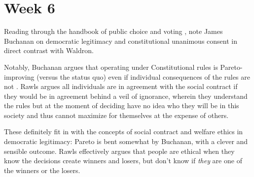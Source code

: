 
\section{Week 6}

Reading through the handbook of public choice and voting \autocite{Heckelman2015}, note James Buchanan on democratic legitimacy and constitutional unanimous consent in direct contrast with Waldron.

Notably, Buchanan argues that operating under Constitutional rules is Pareto-improving (versus the status quo) even if individual consequences of the rules are not \autocite[37]{Heckelman2015}.  Rawls argues all individuals are in agreement with the social contract if they would be in agreement behind a veil of ignorance, wherein they understand the rules but at the moment of deciding have no idea who they will be in this society \autocite[40]{Heckelman2015} and thus cannot maximize for themselves at the expense of others.

These definitely fit in with the concepts of social contract and welfare ethics in democratic legitimacy:  Pareto is bent somewhat by Buchanan, with a clever and sensible outcome.  Rawls effectively argues that people are ethical when they know the decisions create winners and losers, but don't know if \textit{they} are one of the winners or the losers.
